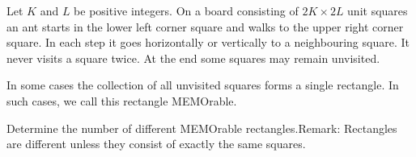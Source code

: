 Let $K$ and $L$ be positive integers. On a board consisting of $2K \times 2L$ unit squares an ant starts in the lower left corner square and walks to the upper right corner square. In each step it goes horizontally or vertically to a neighbouring square. It never visits a square twice. At the end some squares may remain unvisited.

In some cases the collection of all unvisited squares forms a single rectangle. In such cases, we call this rectangle MEMOrable.

Determine the number of different MEMOrable rectangles.Remark: Rectangles are different unless they consist of exactly the same squares.